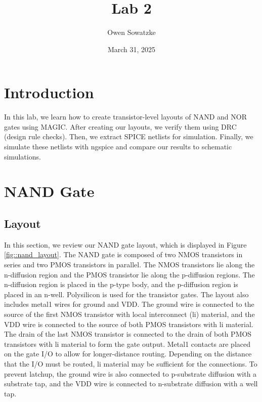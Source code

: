 \documentclass{article}
\title{Lab 2}
\author{Owen Sowatzke}
\date{March 31, 2025}
\newcommand{\zerodisplayskip}{
	\setlength{\abovedisplayskip}{0pt}%
	\setlength{\belowdisplayskip}{0pt}%
	\setlength{\abovedisplayshortskip}{0pt}%
	\setlength{\belowdisplayshortskip}{0pt}%
	\setlength{\mathindent}{0pt}}
\begin{document}
	\maketitle
	
	\section{Introduction}
	
	In this lab, we learn how to create transistor-level layouts of NAND and NOR gates using MAGIC. After creating our layouts, we verify them using DRC (design rule checks). Then, we extract SPICE netlists for simulation. Finally, we simulate these netlists with ngspice and compare our results to schematic simulations. 
	
	\section{NAND Gate}
	
	\subsection{Layout}
	
	In this section, we review our NAND gate layout, which is displayed in Figure \ref{fig::nand_layout}. The NAND gate is composed of two NMOS transistors in series and two PMOS transistors in parallel. The NMOS transistors lie along the n-diffusion region and the PMOS transistor lie along the p-diffusion regions. The n-diffusion region is placed in the p-type body, and the p-diffusion region is placed in an n-well. Polysilicon is used for the transistor gates. The layout also includes metal1 wires for ground and VDD. The ground wire is connected to the source of the first NMOS transistor with local interconnect (li) material, and the VDD wire is connected to the source of both PMOS transistors with li material. The drain of the last NMOS transistor is connected to the drain of both PMOS transistors with li material to form the gate output. Metal1 contacts are placed on the gate I/O to allow for longer-distance routing. Depending on the distance that the I/O must be routed, li material may be sufficient for the connections. To prevent latchup, the ground wire is also connected to p-substrate diffusion with a substrate tap, and the VDD wire is connected to n-substrate diffusion with a well tap.
	
\end{document}
